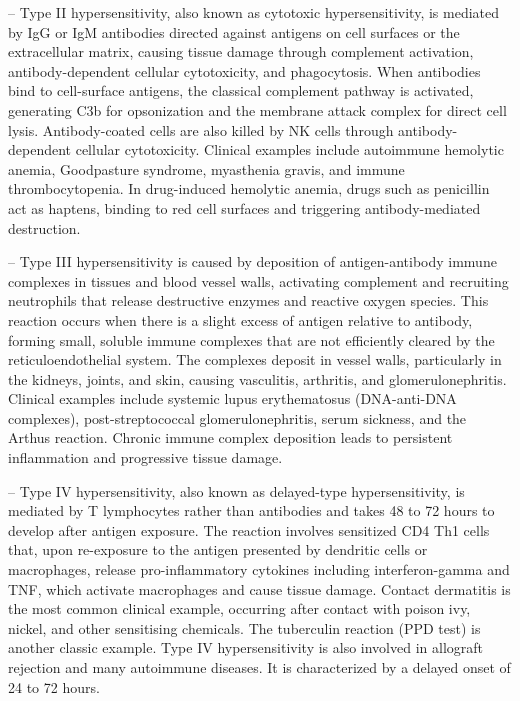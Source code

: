 -- Type II hypersensitivity, also known as cytotoxic hypersensitivity, is mediated by IgG or IgM antibodies directed against antigens on cell surfaces or the extracellular matrix, causing tissue damage through complement activation, antibody-dependent cellular cytotoxicity, and phagocytosis. When antibodies bind to cell-surface antigens, the classical complement pathway is activated, generating C3b for opsonization and the membrane attack complex for direct cell lysis. Antibody-coated cells are also killed by NK cells through antibody-dependent cellular cytotoxicity. Clinical examples include autoimmune hemolytic anemia, Goodpasture syndrome, myasthenia gravis, and immune thrombocytopenia. In drug-induced hemolytic anemia, drugs such as penicillin act as haptens, binding to red cell surfaces and triggering antibody-mediated destruction.

-- Type III hypersensitivity is caused by deposition of antigen-antibody immune complexes in tissues and blood vessel walls, activating complement and recruiting neutrophils that release destructive enzymes and reactive oxygen species. This reaction occurs when there is a slight excess of antigen relative to antibody, forming small, soluble immune complexes that are not efficiently cleared by the reticuloendothelial system. The complexes deposit in vessel walls, particularly in the kidneys, joints, and skin, causing vasculitis, arthritis, and glomerulonephritis. Clinical examples include systemic lupus erythematosus (DNA-anti-DNA complexes), post-streptococcal glomerulonephritis, serum sickness, and the Arthus reaction. Chronic immune complex deposition leads to persistent inflammation and progressive tissue damage.

-- Type IV hypersensitivity, also known as delayed-type hypersensitivity, is mediated by T lymphocytes rather than antibodies and takes 48 to 72 hours to develop after antigen exposure. The reaction involves sensitized CD4 Th1 cells that, upon re-exposure to the antigen presented by dendritic cells or macrophages, release pro-inflammatory cytokines including interferon-gamma and TNF, which activate macrophages and cause tissue damage. Contact dermatitis is the most common clinical example, occurring after contact with poison ivy, nickel, and other sensitising chemicals. The tuberculin reaction (PPD test) is another classic example. Type IV hypersensitivity is also involved in allograft rejection and many autoimmune diseases. It is characterized by a delayed onset of 24 to 72 hours.

